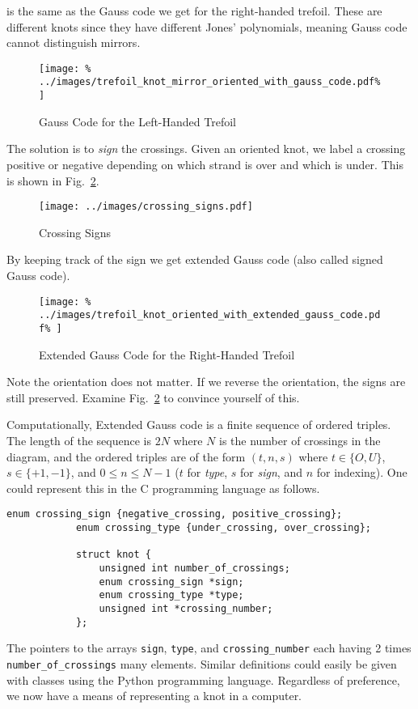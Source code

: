 \documentclass{article}
\theoremstyle{plain}
\begin{document}
        is the same as the Gauss code we get for the right-handed trefoil.
        These are different knots since they have different Jones' polynomials,
        meaning Gauss code cannot distinguish mirrors.
        \begin{figure}
            \centering
            \texttt{[image: \%
                ../images/trefoil\_knot\_mirror\_oriented\_with\_gauss\_code.pdf\%
            ]}
            \caption{Gauss Code for the Left-Handed Trefoil}
            \label{fig:left_handed_trefoil_gauss_code}
        \end{figure}
        The solution is to \textit{sign} the crossings. Given an oriented knot,
        we label a crossing positive or negative depending on which strand is
        over and which is under. This is shown in Fig.~\ref{fig:crossing_signs}.
        \begin{figure}
            \centering
            \texttt{[image: ../images/crossing\_signs.pdf]}
            \caption{Crossing Signs}
            \label{fig:crossing_signs}
        \end{figure}
        By keeping track of the sign we get extended Gauss code
        (also called signed Gauss code).
        \begin{figure}
            \centering
            \texttt{[image: \%
                ../images/trefoil\_knot\_oriented\_with\_extended\_gauss\_code.pdf\%
            ]}
            \caption{Extended Gauss Code for the Right-Handed Trefoil}
            \label{fig:right_hand_trefoil_extended_gauss}
        \end{figure}
        Note the orientation does not matter. If we reverse the orientation,
        the signs are still preserved. Examine Fig.~\ref{fig:crossing_signs} to
        convince yourself of this.
        \par\hfill\par
        Computationally, Extended Gauss code is a finite sequence of ordered
        triples. The length of the sequence is $2N$ where $N$ is the number of
        crossings in the diagram, and the ordered triples are of the form
        $(t,n,s)$ where $t\in\{O,U\}$, $s\in\{+1,-1\}$, and
        $0\leq{n}\leq{N-1}$ ($t$ for \textit{type}, $s$ for \textit{sign}, and
        $n$ for indexing). One could represent this in the C programming
        language as follows.
        \begin{lstlisting}[style=CStyle, gobble=12]
            enum crossing_sign {negative_crossing, positive_crossing};
            enum crossing_type {under_crossing, over_crossing};

            struct knot {
                unsigned int number_of_crossings;
                enum crossing_sign *sign;
                enum crossing_type *type;
                unsigned int *crossing_number;
            };
        \end{lstlisting}
        The pointers to the arrays \texttt{sign}, \texttt{type}, and
        \texttt{crossing\_number} each having 2 times
        \texttt{number\_of\_crossings} many elements.
        Similar definitions could easily be given with classes using the
        Python programming language. Regardless of preference, we now have a
        means of representing a knot in a computer.
\end{document}
